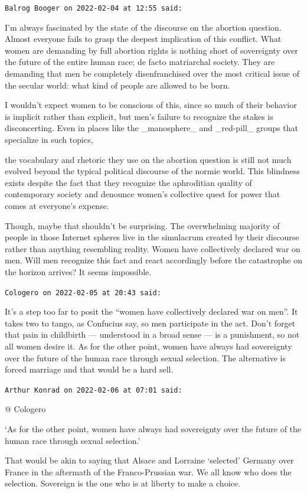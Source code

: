 \begin{footnotesize}
\begin{sffamily}

\texttt{Balrog Booger on 2022-02-04 at 12:55 said:}

I'm always fascinated by the state of the discourse on the abortion question. Almost everyone fails to grasp the deepest implication of this conflict. What women are demanding by full abortion rights is nothing short of sovereignty over the future of the entire human race; de facto matriarchal society. They are demanding that men be completely disenfranchised over the most critical issue of the secular world: what kind of people are allowed to be born.

I wouldn't expect women to be conscious of this, since so much of their behavior is implicit rather than explicit, but men's failure to recognize the stakes is disconcerting. Even in places like the
\_manosphere\_ and \_red-pill\_ groups that specialize in such topics,

the vocabulary and rhetoric they use on the abortion question is still not much evolved beyond the typical political discourse of the normie world. This blindness exists despite the fact that they recognize the aphroditian quality of contemporary society and denounce women's collective quest for power that comes at everyone's expense.

Though, maybe that shouldn't be surprising. The overwhelming majority of people in those Internet spheres live in the simulacrum created by their discourse rather than anything resembling reality. Women have collectively declared war on men. Will men recognize this fact and react accordingly before the catastrophe on the horizon arrives? It seems impossible.

\hfill

\texttt{Cologero on 2022-02-05 at 20:43 said:}

It's a step too far to posit the ``women have collectively declared war on men''. It takes two to tango, as Confucius say, so men participate in the act. Don't forget that pain in childbirth --- understood in a broad sense --- is a punishment, so not all women desire it. As for the other point, women have always had sovereignty over the future of the human race through sexual selection. The alternative is forced marriage and that would be a hard sell.

\hfill

\texttt{Arthur Konrad on 2022-02-06 at 07:01 said:}

@ Cologero

`As for the other point, women have always had sovereignty over the future of the human race through sexual selection.'

That would be akin to saying that Alsace and Lorraine `selected' Germany over France in the aftermath of the Franco-Prussian war. We all know who does the selection. Sovereign is the one who is at liberty to make a choice.

\end{sffamily}
\end{footnotesize}


